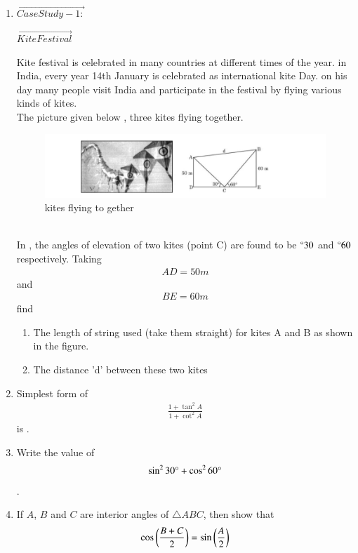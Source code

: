 \begin{enumerate}
\hfill{}\item $\vec{Case Study - 1:}$
\begin{center}
$\vec{Kite Festival}$\\
\end{center}
Kite festival is celebrated in many countries at different times of the year. in India, every year 14th
January is celebrated as international kite Day. on his day many people visit India and participate in the festival by flying various kinds of kites.
\\The picture given below  , three kites flying together.
\begin{figure}[!ht]
\centering
\includegraphics[width=\columnwidth]{cbse-math/figs/kites}
\caption{kites flying to gether}
\label{fig:kites5}
\end{figure}
\\In {}, the angles of elevation of two kites (point C) are found to be $\degree{30}$ and  $\degree{60}$ respectively. Taking \begin{align}AD = 50 m\end{align} and\begin{align} BE = 60 m\end{align}
find
\begin{enumerate}
\item The length of string used (take them straight) for kites A and B as shown in the figure.
\item The distance 'd' between these two kites
\end{enumerate}
\hfill{}
\item Simplest form of 
 \begin{align}
     \frac{1 + \tan^{2}{A}}{1 + \cot^{2}{A}}
 \end{align}is .

\hfill{}\item Write the value of
 \begin{align}
	     \sin^{2}{30\degree} + \cos^{2}{60\degree}
	\end{align}.
\hfill{}\item If $A$, $B$ and $C$ are interior angles of $ \triangle ABC$, then show that
	\begin{align}
	    \cos \left(\frac{B + C}{2}\right)=\sin \left(\frac{A}{2}\right)
	\end{align}
      

\end{enumerate}
